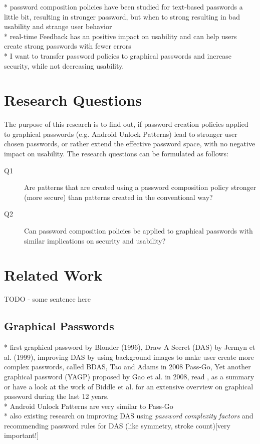 \documentclass[twocolumn, a4paper, 10pt]{article}
\begin{document}
* password composition policies have been studied for text-based passwords a little bit\cite{Inglesant:2010:TCU:1753326.1753384}\cite{Komanduri:2011:PPM:1978942.1979321}, resulting in stronger password, but when to strong resulting in bad usability and strange user behavior\\
* real-time Feedback has an positive impact on usability and can help users create strong passwords with fewer errors\cite{Shay:2015:SSI:2702123.2702586}\\
* I want to transfer password policies to graphical passwords and increase security, while not decreasing usability.

\section{Research Questions}
\label{sec:question}
The purpose of this research is to find out, if password creation policies applied to graphical passwords (e.g. Android Unlock Patterns) lead to stronger user chosen passwords, or rather extend the effective password space, with no negative impact on usability. The research questions can be formulated as follows:

\begin{description}
	\item[Q1]  Are patterns that are created using a password composition policy stronger (more secure) than patterns created in the conventional way?
	\item[Q2] Can password composition policies  be applied to graphical passwords with similar implications on security and usability?
\end{description}
  
\section{Related Work}
\label{sec:related}
TODO - some sentence here
\subsection{Graphical Passwords}
\label{sec:related:grafical}
* first graphical password by Blonder (1996), Draw A Secret (DAS) by Jermyn et al. (1999), improving DAS by using background images to make user create more complex passwords, called BDAS, Tao and Adams in 2008 Pass-Go, Yet another graphical password (YAGP) proposed by Gao et al. in 2008, read \cite{Sun2014308}, \cite{Oorschot:2008:PMU:1284680.1284685} as a summary or have a look at the work of Biddle et al. \cite{Biddle:2012:GPL:2333112.2333114} for an extensive overview on graphical password during the last 12 years.\\
* Android Unlock Patterns are very similar to Pass-Go\\
* also existing research on improving DAS using \textit{password complexity factors} and recommending password rules for DAS (like symmetry, stroke count)[very important!]\cite{Oorschot:2008:PMU:1284680.1284685}
\end{document}
